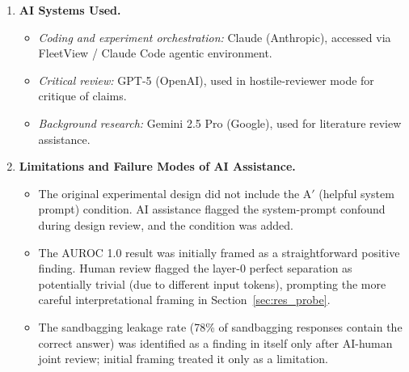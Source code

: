 \begin{enumerate}
\subsection*{AI System Documentation}

\item \textbf{AI Systems Used.}
\begin{itemize}
  \item \textit{Coding and experiment orchestration:} Claude (Anthropic), accessed via FleetView / Claude Code agentic environment.
  \item \textit{Critical review:} GPT-5 (OpenAI), used in hostile-reviewer mode for critique of claims.
  \item \textit{Background research:} Gemini 2.5 Pro (Google), used for literature review assistance.
\end{itemize}

\item \textbf{Limitations and Failure Modes of AI Assistance.}
\begin{itemize}
  \item The original experimental design did not include the A$'$ (helpful system prompt) condition. AI assistance flagged the system-prompt confound during design review, and the condition was added.
  \item The AUROC 1.0 result was initially framed as a straightforward positive finding. Human review flagged the layer-0 perfect separation as potentially trivial (due to different input tokens), prompting the more careful interpretational framing in Section~\ref{sec:res_probe}.
  \item The sandbagging leakage rate (78\% of sandbagging responses contain the correct answer) was identified as a finding in itself only after AI-human joint review; initial framing treated it only as a limitation.
\end{itemize}

\end{enumerate}
